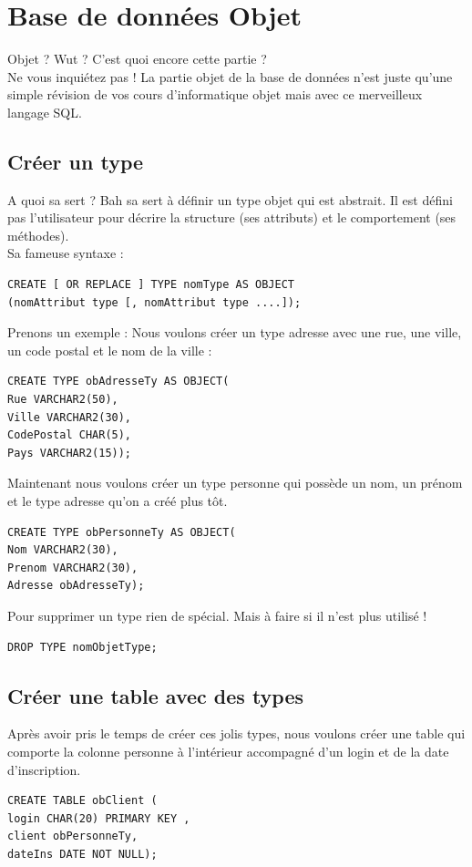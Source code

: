 \documentclass{report}
\begin{document}
\chapter{Base de données Objet}

Objet ? Wut ? C'est quoi encore cette partie ? \\
Ne vous inquiétez pas ! La partie objet de la base de données n'est juste qu'une simple révision de vos cours d'informatique objet mais avec ce merveilleux langage SQL. \\
\section{Créer un type}
A quoi sa sert ? Bah sa sert à définir un type objet qui est abstrait. Il est défini pas l'utilisateur pour décrire la structure (ses attributs) et le comportement (ses méthodes).\\
Sa fameuse syntaxe :
\begin{lstlisting}[style=MySQLStyle]
CREATE [ OR REPLACE ] TYPE nomType AS OBJECT
(nomAttribut type [, nomAttribut type ....]);
\end{lstlisting}

Prenons un exemple : Nous voulons créer un type adresse avec une rue, une ville, un code postal et le nom de la ville :
\begin{lstlisting}[style=MySQLStyle]
CREATE TYPE obAdresseTy AS OBJECT(
Rue VARCHAR2(50),
Ville VARCHAR2(30),
CodePostal CHAR(5),
Pays VARCHAR2(15));
\end{lstlisting}

Maintenant nous voulons créer un type personne qui possède un nom, un prénom et le type adresse qu'on a créé plus tôt.
\begin{lstlisting}[style=MySQLStyle]
CREATE TYPE obPersonneTy AS OBJECT(
Nom VARCHAR2(30),
Prenom VARCHAR2(30),
Adresse obAdresseTy);
\end{lstlisting}

Pour supprimer un type rien de spécial. Mais à faire si il n'est plus utilisé !
\begin{lstlisting}[style=MySQLStyle]
DROP TYPE nomObjetType;
\end{lstlisting}

\section{Créer une table avec des types}
Après avoir pris le temps de créer ces jolis types, nous voulons créer une table qui comporte la colonne personne à l'intérieur accompagné d'un login et de la date d'inscription.
\begin{lstlisting}[style=MySQLStyle]
CREATE TABLE obClient (
login CHAR(20) PRIMARY KEY ,
client obPersonneTy,
dateIns DATE NOT NULL);
\end{lstlisting}
\end{document}
